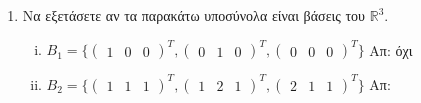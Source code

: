 \begin{enumerate}
                \item Να εξετάσετε αν τα παρακάτω υποσύνολα είναι βάσεις του 
                    $ \mathbb{R}^{3} $.
                    \begin{enumerate}[i)]
                        \item $ B_{1} = 
                            \{ 
                                \begin{pmatrix}1 & 0 & 0\end{pmatrix}^{T} , 
                                \begin{pmatrix}0 & 1 & 0\end{pmatrix}^{T} , 
                                \begin{pmatrix}0 & 0 & 0\end{pmatrix}^{T}
                            \} $ \hfill Απ: όχι 
                        \item $ B_{2} = 
                            \{ 
                                \begin{pmatrix}1 & 1 & 1\end{pmatrix}^{T}, 
                                \begin{pmatrix}1 & 2 & 1\end{pmatrix}^{T} , 
                                \begin{pmatrix}2 & 1 & 1\end{pmatrix}^{T}
                            \} $ \hfill Απ:  
                    \end{enumerate}
                        \end{enumerate}





